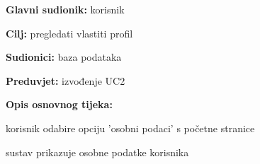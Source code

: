                     
                    \noindent {}
					\begin{packed_item}
	
						\item \textbf{Glavni sudionik: }korisnik
						\item  \textbf{Cilj:} pregledati vlastiti profil
						\item  \textbf{Sudionici:} baza podataka
						\item  \textbf{Preduvjet:} izvođenje UC2
						\item  \textbf{Opis osnovnog tijeka:}
						
						\item[] \begin{packed_enum}
	
							\item korisnik odabire opciju 'osobni podaci' s početne stranice
							\item sustav prikazuje osobne podatke korisnika 
			
						\end{packed_enum}
						
						
					\end{packed_item}

